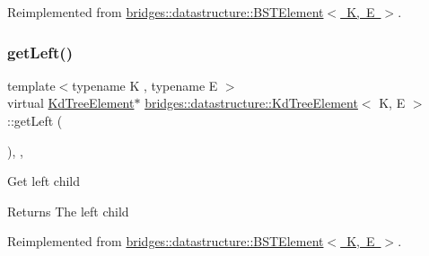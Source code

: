 Reimplemented from \mbox{\hyperlink{classbridges_1_1datastructure_1_1_b_s_t_element_a8f962a01b6e0eff59abeee7768264fd9}{bridges\+::datastructure\+::\+B\+S\+T\+Element$<$ K, E $>$}}.

\mbox{\label{classbridges_1_1datastructure_1_1_kd_tree_element_a875bfa2dfd88a7740f7bcd28a117c12a}} 
\subsubsection{\texorpdfstring{getLeft()}{getLeft()}\hspace{0.1cm}{\footnotesize\ttfamily [1/2]}}
{\footnotesize\ttfamily template$<$typename K , typename E $>$ \\
virtual \mbox{\hyperlink{classbridges_1_1datastructure_1_1_kd_tree_element}{Kd\+Tree\+Element}}$\ast$ \mbox{\hyperlink{classbridges_1_1datastructure_1_1_kd_tree_element}{bridges\+::datastructure\+::\+Kd\+Tree\+Element}}$<$ K, E $>$\+::get\+Left (\begin{DoxyParamCaption}{ }\end{DoxyParamCaption})\hspace{0.3cm}{\ttfamily [inline]}, {\ttfamily [override]}, {\ttfamily [virtual]}}

Get left child \begin{DoxyReturn}{Returns}
The left child 
\end{DoxyReturn}


Reimplemented from \mbox{\hyperlink{classbridges_1_1datastructure_1_1_b_s_t_element_af863c624691c11db26ae3b6d723d1f5c}{bridges\+::datastructure\+::\+B\+S\+T\+Element$<$ K, E $>$}}.

\mbox{\label{classbridges_1_1datastructure_1_1_kd_tree_element_a653597918fbc6e31b84fcf8dbdf67122}} 

